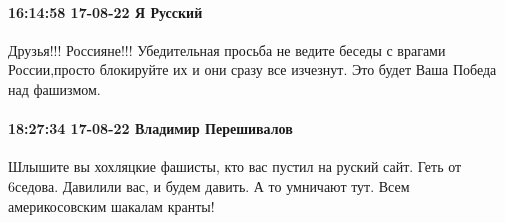  
 
 
 
 

\paragraph{16:14:58 17-08-22 Я Русский}

Друзья!!! Россияне!!! Убедительная просьба не ведите беседы с врагами
России,просто блокируйте их и они сразу все изчезнут. Это будет Ваша Победа над
фашизмом.

\paragraph{18:27:34 17-08-22 Владимир Перешивалов}

Шлышите вы хохляцкие фашисты, кто вас пустил на руский сайт. Геть от 6седова.
Давилили вас, и будем давить. А то умничают тут. Всем америкосовским шакалам
кранты!
